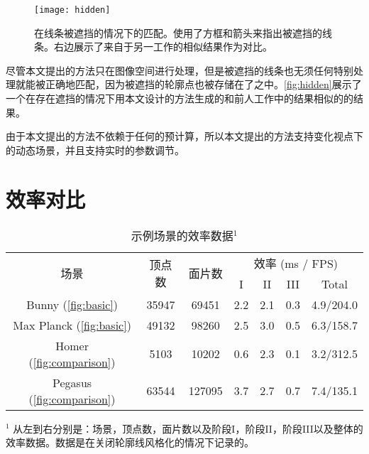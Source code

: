 \begin{figure}[!t]
    \centering
    \texttt{[image: hidden]}
    \caption{\label{fig:hidden}
    在线条被遮挡的情况下的匹配。使用了方框和箭头来指出被遮挡的线条。右边展示了来自于另一工作\cite{bukenberger2018stereo}的相似结果作为对比。}
\end{figure}

尽管本文提出的方法只在图像空间进行处理，但是被遮挡的线条也无须任何特别处理就能被正确地匹配，因为被遮挡的轮廓点也被存储在了\ppll{}之中。\autoref{fig:hidden}展示了一个在存在遮挡的情况下用本文设计的方法生成的和前人工作中的结果相似的的结果。

由于本文提出的方法不依赖于任何的预计算，所以本文提出的方法支持变化视点下的动态场景，并且支持实时的参数调节。

\section{效率对比}

\begin{table}[!t]
    \renewcommand{\arraystretch}{1.3}
    \centering
  \begin{threeparttable}
    \caption{示例场景的效率数据$^1$}
    \label{tab:performance}
    \centering
    \begin{tabular}{c|cc|ccc|c}
    \hline
    \multirow{2}{*}{场景} & \multirow{2}{*}{顶点数} & \multirow{2}{*}{面片数} & \multicolumn{4}{c}{效率 (ms / FPS)} \\
    \cline{4-7}
    & & & I & II & III & Total \\
    \hline
    Bunny (\autoref{fig:basic}) & 35947 & 69451 & {2.2} & {2.1} & {0.3} & {4.9/204.0} \\
    Max Planck (\autoref{fig:basic}) & 49132 & 98260 & {2.5} & {3.0} & {0.5} & {6.3/158.7} \\
    Homer (\autoref{fig:comparison}) & 5103 & 10202 & {0.6} & {2.3} & {0.1} & {3.2/312.5} \\
    Pegasus (\autoref{fig:comparison}) & 63544 & 127095 & {3.7} & {2.7} & {0.7} & {7.4/135.1} \\
    \hline
    \end{tabular}
    \begin{tablenotes}
      \item $^1$ 从左到右分别是：场景，顶点数，面片数以及阶段I，阶段II，阶段III以及整体的效率数据。数据是在关闭轮廓线风格化的情况下记录的。
    \end{tablenotes}
  \end{threeparttable}
\end{table}

